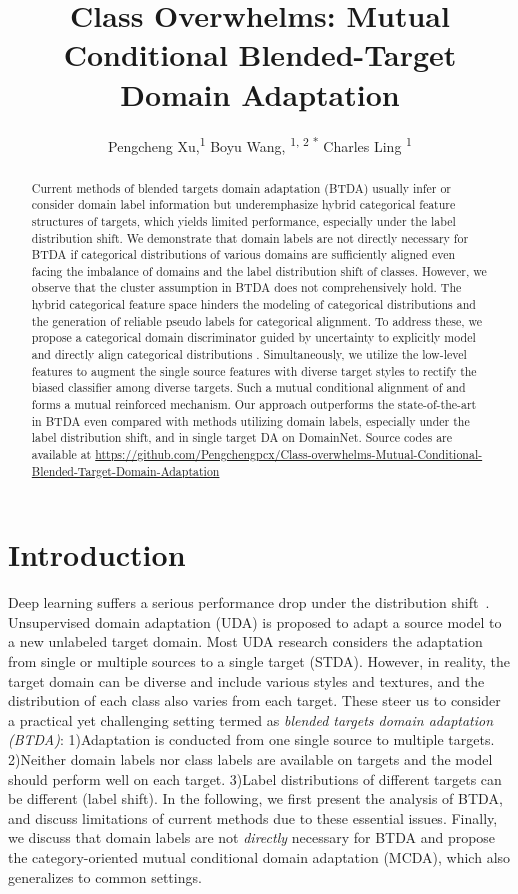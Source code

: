 \documentclass[letterpaper]{article} \usepackage{aaai23}  \usepackage{times}  \usepackage{helvet}  \usepackage{courier}  \usepackage[hyphens]{url}  \usepackage{graphicx} \urlstyle{rm} \def\UrlFont{\rm}  \usepackage{natbib}  \usepackage{caption} \frenchspacing  \setlength{\pdfpagewidth}{8.5in}  \setlength{\pdfpageheight}{11in}
\title{Class Overwhelms: Mutual Conditional Blended-Target Domain Adaptation}
\author{
    Pengcheng Xu,\textsuperscript{\rm 1}
    Boyu Wang, \textsuperscript{\rm 1, \rm 2 *}
    Charles Ling \textsuperscript{\rm 1}
}
\begin{document}
\maketitle

\begin{abstract}
Current methods of blended targets domain adaptation (BTDA) usually infer or consider domain label information but underemphasize hybrid categorical feature structures of targets, which yields limited performance, especially under the label distribution shift.
We demonstrate that domain labels are not directly necessary for BTDA if categorical distributions of various domains are sufficiently aligned even facing the imbalance of domains and the label distribution shift of classes.
However, we observe that the cluster assumption in BTDA does not comprehensively hold. The hybrid categorical feature space hinders the modeling of categorical distributions and the generation of reliable pseudo labels for categorical alignment.
To address these, we propose a categorical domain discriminator guided by uncertainty to explicitly model and directly align categorical distributions . Simultaneously, we utilize the low-level features to augment the single source features with diverse target styles to rectify the biased classifier  among diverse targets. Such a mutual conditional alignment of  and  forms a mutual reinforced mechanism.
Our approach outperforms the state-of-the-art in BTDA even compared with methods utilizing domain labels, especially under the label distribution shift, and in single target DA on DomainNet. Source codes are available at \url{https://github.com/Pengchengpcx/Class-overwhelms-Mutual-Conditional-Blended-Target-Domain-Adaptation}
\end{abstract}



\section{Introduction}
Deep learning suffers a serious performance drop under the distribution shift~\cite{ben2006analysis}. Unsupervised domain adaptation (UDA) is proposed to adapt a source model to a new unlabeled target domain. Most UDA research considers the adaptation from single or multiple sources to a single target (STDA). However, in reality, the target domain can be diverse and include various styles and textures, and the distribution of each class also varies from each target. These steer us to consider a practical yet challenging setting termed as \textit{blended targets domain adaptation (BTDA)}: 1)Adaptation is conducted from one single source to multiple targets. 2)Neither domain labels nor class labels are available on targets and the model should perform well on each target. 3)Label distributions of different targets can be different (label shift). In the following, we first present the analysis of BTDA, and discuss limitations of current methods due to these essential issues. Finally, we discuss that domain labels are not \textit{directly} necessary for BTDA and propose the category-oriented mutual conditional domain adaptation (MCDA), which also generalizes to common settings.
\end{document}

